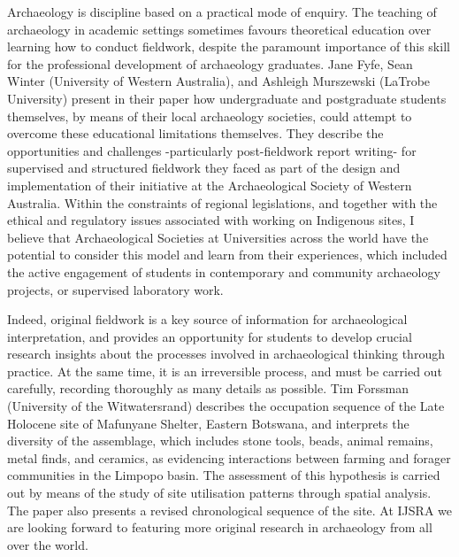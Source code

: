 Archaeology is discipline based on a practical mode of enquiry. The teaching of archaeology in academic settings sometimes favours theoretical education over learning how to conduct fieldwork, despite the paramount importance of this skill for the professional development of archaeology graduates. Jane Fyfe, Sean Winter (University of Western Australia), and Ashleigh Murszewski (LaTrobe University) present in their paper how undergraduate and postgraduate students themselves, by means of their local archaeology societies, could attempt to overcome these educational limitations themselves. They describe the opportunities and challenges -particularly post-fieldwork report writing- for supervised and structured fieldwork they faced as part of the design and implementation of their initiative at the Archaeological Society of Western Australia. Within the constraints of regional legislations, and together with the ethical and regulatory issues associated with working on Indigenous sites, I believe that Archaeological Societies at Universities across the world have the potential to consider this model and learn from their experiences, which included the active engagement of students in contemporary and community archaeology projects, or supervised laboratory work.

Indeed, original fieldwork is a key source of information for archaeological interpretation, and provides an opportunity for students to develop crucial research insights about the processes involved in archaeological thinking through practice. At the same time, it is an irreversible process, and must be carried out carefully, recording thoroughly as many details as possible. Tim Forssman (University of the Witwatersrand) describes the occupation sequence of the Late Holocene site of Mafunyane Shelter, Eastern Botswana, and interprets the diversity of the assemblage, which includes stone tools, beads, animal remains, metal finds, and ceramics, as evidencing interactions between farming and forager communities in the Limpopo basin. The assessment of this hypothesis is carried out by means of the study of site utilisation patterns through spatial analysis. The paper also presents a revised chronological sequence of the site. At IJSRA we are looking forward to featuring more original research in archaeology from all over the world. 

